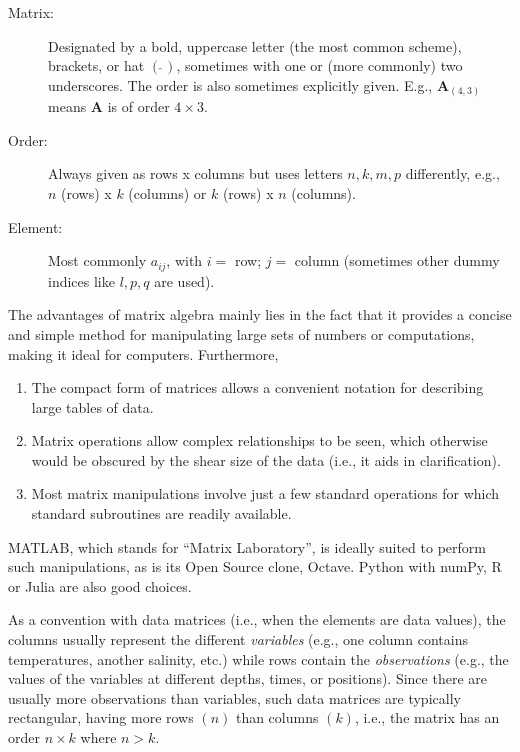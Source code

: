 \begin{description}

\item [Matrix:] Designated by a bold, uppercase letter (the most common scheme), brackets, or hat $(\hat{ \ })$,
sometimes with one or (more commonly) two underscores.
The order is also sometimes explicitly given.  E.g., $\mathbf{A}_{(4,3)}$ means 
$\mathbf A$ is of order $4 \times 3$.

\item [Order:] Always given as rows x columns but uses letters $n,k,m,p$ differently, e.g., $n$ (rows) x $k$ (columns) or 
$k$ (rows) x $n$ (columns).

\item [Element:] Most commonly $a_{ij}$, with $i =$ row; $j =$ column (sometimes other dummy indices like $l,p,q$ are used).
\end{description}

The advantages of matrix algebra mainly lies in the fact that it provides a concise and simple 
method for manipulating large sets of numbers or computations, making it ideal for computers. 
Furthermore,

\begin{enumerate}

\item The compact form of matrices allows a convenient notation for describing large tables of data.

\item Matrix operations allow complex relationships to be seen, which otherwise would be obscured by the 
shear size of the data (i.e., it aids in clarification).

\item Most matrix manipulations involve just a 
few standard operations for which standard subroutines are readily available.
\end{enumerate}

MATLAB, which stands for ``Matrix Laboratory'', is ideally suited to perform such manipulations,
as is its Open Source clone, Octave. Python with numPy, R or Julia are also good choices.

	As a convention with data matrices (i.e., when the elements are data values), the columns 
usually represent the different \emph{variables} (e.g., one column contains temperatures, another salinity, 
etc.) while rows contain the \emph{observations} (e.g., the values of the variables at different depths, times, or positions). Since 
there are usually more observations than variables, such data matrices are typically rectangular, having 
more rows $(n)$ than columns $(k)$, i.e., the matrix has an order $n \times k$ where $n > k$.

